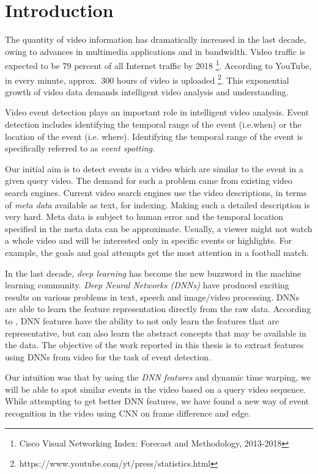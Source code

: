 \chapter{Introduction}
\label{chap:intro}

The quantity of video information has dramatically increased in the last decade, owing to advances in multimedia applications and in bandwidth.  Video traffic is expected to be  79 percent of all Internet traffic by 2018 \footnote{Cisco Visual Networking Index: Forecast and Methodology, 2013-2018}.  According to YouTube, in every minute, approx.~300 hours of video is uploaded \footnote{https://www.youtube.com/yt/press/statistics.html}.  This exponential growth of video data demands intelligent video analysis and understanding.

Video event detection plays an important role in intelligent video analysis.  Event detection includes identifying the temporal range of the event (i.e.when) or the location of the event (i.e.  where).  Identifying the temporal range of the event is specifically referred to as \textit{event spotting}. 

Our initial aim is to detect events in a video which are similar to the event in a given query video.  The demand for such a problem came from existing video search engines.  Current video search engines use the video descriptions, in terms of  \textit{meta data} available as text, for indexing.  Making such a detailed description is very hard.  Meta data is subject to human error and the temporal location specified in the meta data can be approximate.  Usually, a viewer might not watch a whole video and will be interested only in specific events or highlights.  For example, the goals and goal attempts get the most attention in a football match.

In the last decade, \textit{deep learning} has become the new buzzword in the machine learning community.  \textit{Deep Neural Networks (DNNs)} have produced exciting results on various problems in text, speech and image/video processing.  DNNs are able to learn the feature representation directly from the raw data.  According to \citet{hinton2009deep}, DNN features have the ability to not only learn the features that are representative, but can also learn the abstract concepts that may be available in the data.   The objective of the work reported in this thesis is to extract features using DNNs from video for the task of event detection.

Our intuition was that by using the \textit{DNN features} and dynamic time warping, we will be able  to spot similar events in the video based on a query video sequence.  While attempting  to get better DNN features, we have found a new  way of event recognition in the video using CNN on frame difference and edge.

